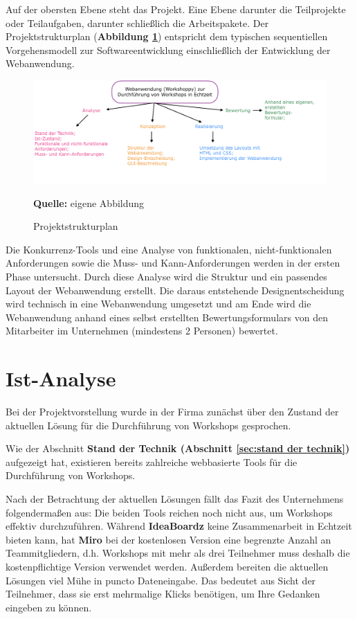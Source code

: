 Auf der obersten Ebene steht das Projekt. Eine Ebene darunter die Teilprojekte oder Teilaufgaben, darunter schließlich die Arbeitspakete. Der Projektstrukturplan (\textbf{Abbildung \ref{fig:projektstruktur}}) entspricht dem typischen sequentiellen Vorgehensmodell zur Softwareentwicklung einschließlich der Entwicklung der Webanwendung. 

\begin{figure}[H]
  \begin{center}
    \includegraphics[scale=0.4]{img/projektstruktur}
	\caption{Projektstrukturplan} 
	\footnotesize\sffamily\textbf{Quelle:} eigene Abbildung  
	\label{fig:projektstruktur}
  \end{center}   
\end{figure}

Die Konkurrenz-Tools und eine Analyse von funktionalen, nicht-funktionalen Anforderungen sowie die Muss- und Kann-Anforderungen werden in der ersten Phase untersucht. Durch diese Analyse wird die Struktur und ein passendes Layout der Webanwendung erstellt. Die daraus entstehende Designentscheidung wird technisch in eine Webanwendung umgesetzt und am Ende wird die Webanwendung anhand eines selbst erstellten Bewertungsformulars von den Mitarbeiter im Unternehmen (mindestens 2 Personen) bewertet.

\section{Ist-Analyse}
\label{sec:istAnalyse}
Bei der Projektvorstellung wurde in der Firma zunächst über den Zustand der aktuellen Lösung für die Durchführung von Workshops gesprochen.\bigskip

Wie der Abschnitt \textbf{Stand der Technik (Abschnitt \ref{sec:stand der technik})} aufgezeigt hat, existieren bereits zahlreiche webbasierte Tools für die Durchführung von Workshops.\bigskip

Nach der Betrachtung der aktuellen Lösungen fällt das Fazit des Unternehmens folgendermaßen aus: Die beiden Tools reichen noch nicht aus, um Workshops effektiv durchzuführen. Während \textbf{IdeaBoardz} keine Zusammenarbeit in Echtzeit bieten kann, hat \textbf{Miro} bei der kostenlosen Version eine begrenzte Anzahl an Teammitgliedern, d.h. Workshops mit mehr als drei Teilnehmer muss deshalb die kostenpflichtige Version verwendet werden. Außerdem bereiten die aktuellen Lösungen viel Mühe in puncto Dateneingabe. Das bedeutet aus Sicht der Teilnehmer, dass sie erst mehrmalige \glqq Klicks\grqq{} benötigen, um Ihre Gedanken eingeben zu können.\bigskip

